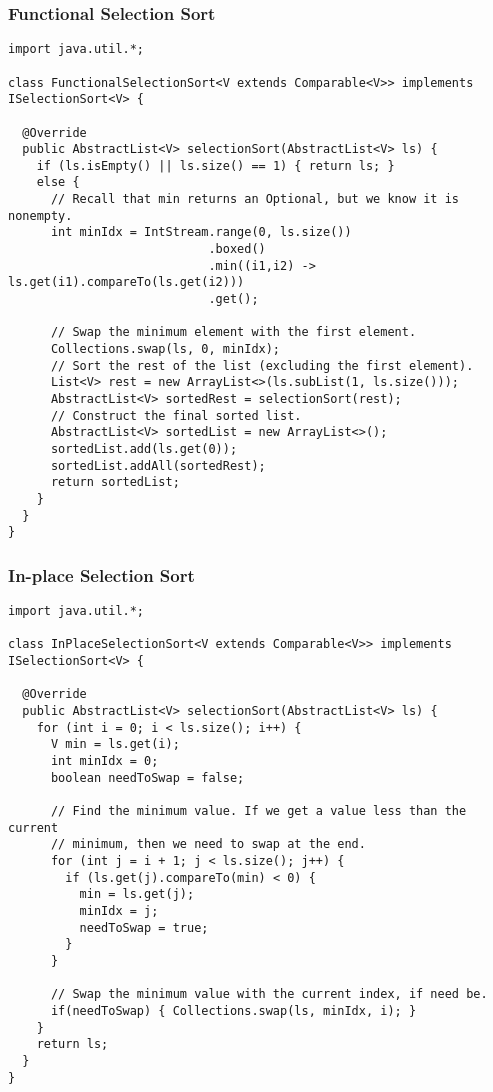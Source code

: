 \subsubsection*{Functional Selection Sort}
\begin{lstlisting}[language=MyJava]
import java.util.*;

class FunctionalSelectionSort<V extends Comparable<V>> implements ISelectionSort<V> {

  @Override
  public AbstractList<V> selectionSort(AbstractList<V> ls) {
    if (ls.isEmpty() || ls.size() == 1) { return ls; } 
    else {
      // Recall that min returns an Optional, but we know it is nonempty.
      int minIdx = IntStream.range(0, ls.size())
                            .boxed()
                            .min((i1,i2) -> ls.get(i1).compareTo(ls.get(i2)))
                            .get();

      // Swap the minimum element with the first element.
      Collections.swap(ls, 0, minIdx);
      // Sort the rest of the list (excluding the first element).
      List<V> rest = new ArrayList<>(ls.subList(1, ls.size()));
      AbstractList<V> sortedRest = selectionSort(rest);
      // Construct the final sorted list.
      AbstractList<V> sortedList = new ArrayList<>();
      sortedList.add(ls.get(0));
      sortedList.addAll(sortedRest);
      return sortedList;
    }
  }
}
\end{lstlisting}

\enlargethispage{3\baselineskip}
\subsubsection*{In-place Selection Sort}
\begin{lstlisting}[language=MyJava]
import java.util.*;

class InPlaceSelectionSort<V extends Comparable<V>> implements ISelectionSort<V> {
  
  @Override
  public AbstractList<V> selectionSort(AbstractList<V> ls) {
    for (int i = 0; i < ls.size(); i++) {
      V min = ls.get(i);
      int minIdx = 0;
      boolean needToSwap = false;

      // Find the minimum value. If we get a value less than the current 
      // minimum, then we need to swap at the end.
      for (int j = i + 1; j < ls.size(); j++) {
        if (ls.get(j).compareTo(min) < 0) {
          min = ls.get(j);
          minIdx = j;
          needToSwap = true;
        }
      }

      // Swap the minimum value with the current index, if need be.
      if(needToSwap) { Collections.swap(ls, minIdx, i); }
    }
    return ls;
  }
}
\end{lstlisting}  


